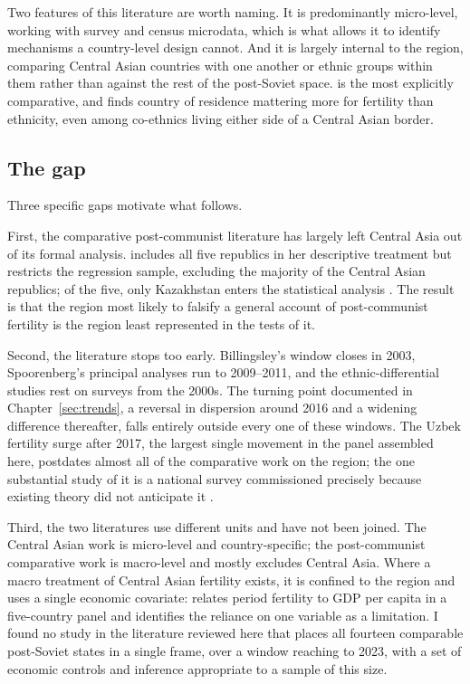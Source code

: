 Two features of this literature are worth naming. It is predominantly micro-level, working with survey and census microdata, which is what allows it to identify mechanisms a country-level design cannot. And it is largely internal to the region, comparing Central Asian countries with one another or ethnic groups within them rather than against the rest of the post-Soviet space. \textcite{nedoluzhko2012} is the most explicitly comparative, and finds country of residence mattering more for fertility than ethnicity, even among co-ethnics living either side of a Central Asian border.

\subsection{The gap}
\label{sec:gap-literature}

Three specific gaps motivate what follows.

First, the comparative post-communist literature has largely left Central Asia out of its formal analysis. \textcite{billingsley2010} includes all five republics in her descriptive treatment but restricts the regression sample, excluding the majority of the Central Asian republics; of the five, only Kazakhstan enters the statistical analysis \parencite{spoorenberg2015}. The result is that the region most likely to falsify a general account of post-communist fertility is the region least represented in the tests of it.

Second, the literature stops too early. Billingsley's window closes in 2003, Spoorenberg's principal analyses run to 2009--2011, and the ethnic-differential studies rest on surveys from the 2000s. The turning point documented in Chapter~\ref{sec:trends}, a reversal in dispersion around 2016 and a widening difference thereafter, falls entirely outside every one of these windows. The Uzbek fertility surge after 2017, the largest single movement in the panel assembled here, postdates almost all of the comparative work on the region; the one substantial study of it is a national survey commissioned precisely because existing theory did not anticipate it \parencite{unfpa2023}.

Third, the two literatures use different units and have not been joined. The Central Asian work is micro-level and country-specific; the post-communist comparative work is macro-level and mostly excludes Central Asia. Where a macro treatment of Central Asian fertility exists, it is confined to the region and uses a single economic covariate: \textcite{spoorenberg2015} relates period fertility to GDP per capita in a five-country panel and identifies the reliance on one variable as a limitation. I found no study in the literature reviewed here that places all fourteen comparable post-Soviet states in a single frame, over a window reaching to 2023, with a set of economic controls and inference appropriate to a sample of this size.

